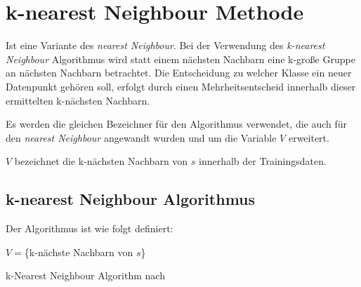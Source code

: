 \documentclass[fontsize=11pt]{scrartcl}
\begin{document}
        \section{k-nearest Neighbour Methode}
            Ist eine Variante des \emph{nearest Neighbour}. Bei der Verwendung des \emph{k-nearest Neighbour} Algorithmus wird statt einem nächsten Nachbarn eine k-große Gruppe an nächsten Nachbarn betrachtet. Die Entscheidung zu welcher Klasse ein neuer Datenpunkt gehören soll, erfolgt durch einen Mehrheitsentscheid innerhalb dieser ermittelten k-nächsten Nachbarn.\cite{ertel2016}\par
            Es werden die gleichen Bezeichner für den Algorithmus verwendet, die auch für den \emph{nearest Neighbour} angewandt wurden und um die Variable $V$ erweitert.\par $V$ bezeichnet die k-nächsten Nachbarn von $s$ innerhalb der Trainingsdaten.
        
                           
            \subsection{k-nearest Neighbour Algorithmus}
                Der Algorithmus ist wie folgt definiert:\par
                \begin{algorithm}[H]
                    $V= $\{k-nächste Nachbarn von $s$\}\;
                    {
                        \;
                    }
                           
                    \caption{k-Nearest Neighbour Algorithm nach \cite[S.209]{ertel2016}}
                \end{algorithm}\par
                
\end{document}
